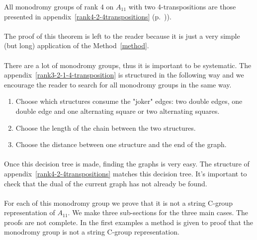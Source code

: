 \begin{theorem}
  All monodromy groups of rank 4 on $A_{11}$ with two 4-transpositions are those presented in appendix~\ref{rank4-2-4transpositions} (p.~\pageref{rank4-2-4transpositions})).
\end{theorem}

\paragraph{}
The proof of this theorem is left to the reader because it is just a very simple (but long) application of the Method~\ref{method}.

\paragraph{}
There are a lot of monodromy groups, thus it is important to be systematic. The appendix~\ref{rank3-2-1-4-transposition} is structured in the following way and we encourage the reader to search for all monodromy groups in the same way.

\begin{enumerate}
  \item Choose which structures consume the "joker" edges: two double edges, one double edge and one alternating square or two alternating squares.
  \item Choose the length of the chain between the two structures.
  \item Choose the distance between one structure and the end of the graph.
\end{enumerate}

\paragraph{}
Once this decision tree is made, finding the graphs is very easy. The structure of appendix~\ref{rank4-2-4transpositions} matches this decision tree. It's important to check that the dual of the current graph has not already be found.

\paragraph{}
For each of this monodromy group we prove that it is not a string C-group representation of $A_{11}$. We make three sub-sections for the three main cases. The proofs are not complete. In the first examples a method is given to proof that the monodromy group is not a string C-group representation.

